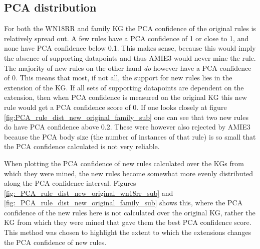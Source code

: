 \subsection{PCA distribution}
For both the WN18RR and family KG the PCA confidence of the original rules is relatively spread out. A few rules have a PCA confidence of 1 or close to 1, and none have PCA confidence below 0.1. This makes sense, because this would imply the absence of supporting datapoints and thus AMIE3 would never mine the rule. The majority of new rules on the other hand \textit{do} however have a PCA confidence of 0. This means that most, if not all, the support for new rules lies in the extension of the KG. If all sets of supporting datapoints are dependent on the extension, then when PCA confidence is measured on the original KG this new rule would get a PCA confidence score of 0. If one looks closely at figure \ref{fig:PCA_rule_dist_new_original_family_sub} one can see that two new rules do have PCA confidence above 0.2. These were however also rejected by AMIE3 because the PCA body size (the number of instances of that rule) is so small that the PCA confidence calculated is not very reliable.

When plotting the PCA confidence of new rules calculated over the KGs from which they were mined, the new rules become somewhat more evenly distributed along the PCA confidence interval. Figures \ref{fig:_PCA_rule_dist_new_original_wn18rr_sub} and \ref{fig:_PCA_rule_dist_new_original_family_sub} shows this, where the PCA confidence of the new rules here is not calculated over the original KG, rather the KG from which they were mined that gave them the best PCA confidence score. This method was chosen to highlight the extent to which the extensions changes the PCA confidence of new rules.

